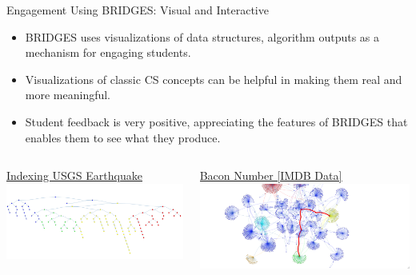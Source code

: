 \documentclass[aspectratio=169]{beamer}
\begin{document}
\begin{frame}{Engagement Using BRIDGES: Visual and Interactive}
\begin{itemize}
	\item BRIDGES uses visualizations of data structures, algorithm outputs
		as a mechanism for engaging students.
	\item Visualizations of classic CS concepts can be helpful in making
		them real and more meaningful. 
	\item Student feedback is very positive, appreciating the features
		of BRIDGES that enables them to see what they produce.
\end{itemize}
  \begin{columns}
    \begin{column}{.47\linewidth}
      \begin{block}{\href{http://bridges-cs.herokuapp.com/assignments/137/kalpathi60}{\underline{Indexing USGS Earthquake}}}
        \includegraphics[width=\linewidth]{figs/BSTEq.png}
      \end{block}
    \end{column}
    \begin{column}{.47\linewidth}
      \begin{block}{\href{http://bridges-cs.herokuapp.com/assignments/1002/bridges_public}{\underline{Bacon Number [IMDB Data]}}}
        \includegraphics[width=\linewidth]{figs/BaconNumber.png}
      \end{block}
    \end{column}
  \end{columns}  
\end{frame}
\end{document}

